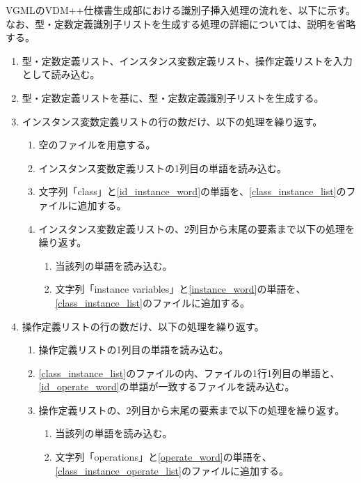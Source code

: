 VGMLのVDM++仕様書生成部における識別子挿入処理の流れを、以下に示す。
なお、型・定数定義識別子リストを生成する処理の詳細については、説明を省略する。

\begin{enumerate}
    \item 型・定数定義リスト、インスタンス変数定義リスト、操作定義リストを入力として読み込む。
    \item 型・定数定義リストを基に、型・定数定義識別子リストを生成する。
    \item インスタンス変数定義リストの行の数だけ、以下の処理を繰り返す。
        \begin{enumerate}
            \item 空のファイルを用意する。
            \label{class_instance_list}
            \item インスタンス変数定義リストの1列目の単語を読み込む。
            \label{id_instance_word}
            \item 文字列「class」と\ref{id_instance_word}の単語を、\ref{class_instance_list}のファイルに追加する。
            \item インスタンス変数定義リストの、2列目から末尾の要素まで以下の処理を繰り返す。
                \begin{enumerate}
                    \item 当該列の単語を読み込む。
                    \label{instance_word}
                    \item 文字列「instance variables」と\ref{instance_word}の単語を、\ref{class_instance_list}のファイルに追加する。
                \end{enumerate}
        \end{enumerate}
    \item 操作定義リストの行の数だけ、以下の処理を繰り返す。
        \begin{enumerate}
            \item 操作定義リストの1列目の単語を読み込む。
            \label{id_operate_word}
            \item \ref{class_instance_list}のファイルの内、ファイルの1行1列目の単語と、\ref{id_operate_word}の単語が一致するファイルを読み込む。
            \label{class_instance_operate_list}
            \item 操作定義リストの、2列目から末尾の要素まで以下の処理を繰り返す。
                \begin{enumerate}
                    \item 当該列の単語を読み込む。
                    \label{operate_word}
                    \item 文字列「operations」と\ref{operate_word}の単語を、\ref{class_instance_operate_list}のファイルに追加する。
                \end{enumerate}
        \end{enumerate}
\end{enumerate}

